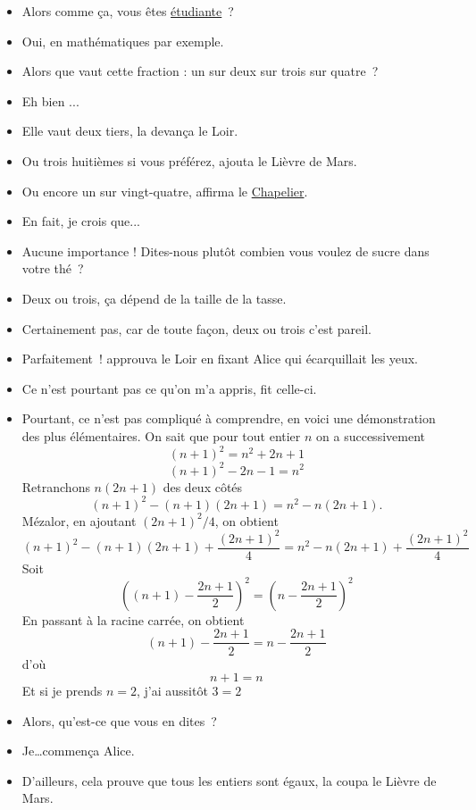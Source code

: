  \begin{itemize}

 \item Alors comme ça, vous êtes \href{http://fr.wikipedia.org/wiki/Manifestations_de_la_place_Tian'anmen}{étudiante}~?
 \item Oui, en mathématiques par exemple.
 \item Alors que vaut cette fraction : un sur deux sur trois sur quatre~?
 \item Eh bien ...
 \item Elle vaut deux tiers, la devança le Loir.
 \item Ou trois huitièmes si vous préférez, ajouta le Lièvre de Mars.
 \item Ou encore un sur vingt-quatre, affirma le  \href{http://fr.wikipedia.org/wiki/http://fr.wikipedia.org/wiki/Chapelier_fou_(Alice_au_pays_des_merveilles)}{Chapelier}.
 \item En fait, je crois que...
\item Aucune importance ! Dites-nous plutôt combien vous voulez de sucre dans votre thé~?
\item Deux ou trois, ça dépend de la taille de la tasse.
\item Certainement pas, car de toute façon, deux ou trois c'est pareil.
\item Parfaitement~! approuva le Loir en fixant Alice qui écarquillait les yeux.
\item Ce n'est pourtant pas ce qu'on m'a appris, fit celle-ci.
\item Pourtant, ce n'est pas compliqué à comprendre, en voici une démonstration des plus élémentaires. On sait que pour tout entier $n$ on a successivement
                \[ 
			(n+1)^2=n^2+2n+1
		\]
                \[
			(n+1)^2-2n-1=n^2
		\]
	Retranchons $n(2n+1)$ des deux côtés
                \[
			(n+1)^2-(n+1)(2n+1)=n^2-n(2n+1).
		\]
	Mézalor, en ajoutant $(2n+1)^2/4$, on obtient
		\[ 
                	(n+1)^2-(n+1)(2n+1)+\frac{(2n+1)^2}{4}=n^2-n(2n+1)+\frac{(2n+1)^2}{4}
		\]
	Soit
		\[
	                \left((n+1)-\frac{2n+1}{2}\right)^2=\left(n-\frac{2n+1}{2}\right)^2
		\]
	En passant à la racine carrée, on obtient
		\[ 
			(n+1)-\frac{2n+1}{2}=n-\frac{2n+1}{2}
		\]
	d'où
		\[ 
			n+1=n
		\]
Et si je prends $n=2$, j'ai aussitôt $3=2$
\item Alors, qu'est-ce que vous en dites~?
\item Je\ldots commença Alice.
\item D'ailleurs, cela prouve que tous les entiers sont égaux, la coupa le Lièvre de Mars.

\end{itemize}
